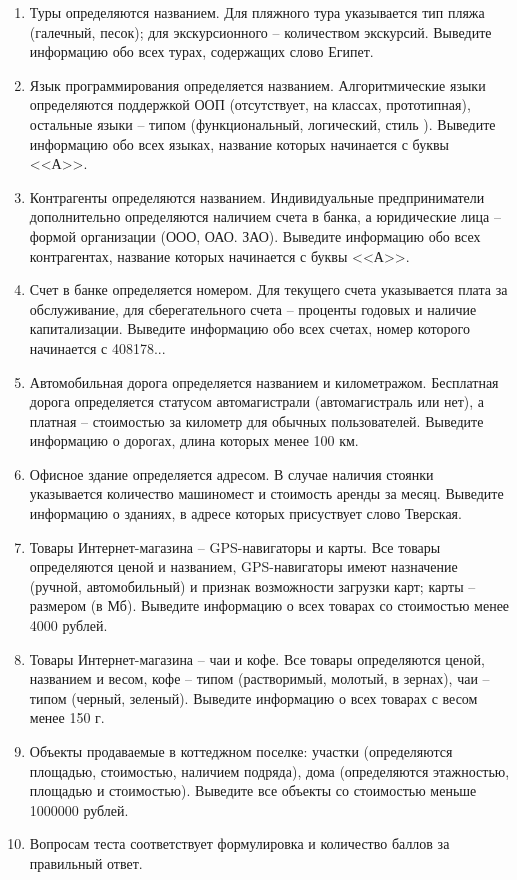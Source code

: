\begin{enumerate}
\item  Туры определяются названием. Для пляжного тура указывается тип пляжа (галечный, песок); для экскурсионного --
количеством экскурсий. Выведите информацию обо всех турах, содержащих слово Египет.
\item Язык программирования определяется названием. Алгоритмические языки определяются поддержкой ООП
(отсутствует, на классах, прототипная), остальные языки -- типом (функциональный, логический, стиль ). 
Выведите информацию обо всех языках, название которых начинается с буквы <<А>>.
\item Контрагенты определяются названием. Индивидуальные предприниматели дополнительно определяются
наличием счета в банка, а юридические лица -- формой организации (ООО, ОАО. ЗАО).
Выведите информацию обо всех контрагентах, название которых начинается с буквы <<А>>.
\item Счет в банке определяется номером. Для текущего счета указывается плата за обслуживание, 
для сберегательного счета -- проценты годовых и наличие капитализации.
Выведите информацию обо всех счетах, номер которого начинается с 408178...
\item Автомобильная дорога определяется названием и километражом. Бесплатная дорога определяется статусом автомагистрали
(автомагистраль или нет), а платная -- стоимостью за километр для обычных пользователей. Выведите информацию о дорогах,
длина которых менее 100 км.
\item Офисное здание определяется адресом. В случае наличия стоянки указывается количество машиномест и стоимость
аренды за месяц. Выведите информацию о зданиях, в адресе которых присуствует слово Тверская.
\item Товары Интернет-магазина -- GPS-навигаторы и карты. 
Все товары определяются ценой и названием, GPS-навигаторы имеют назначение (ручной, автомобильный) и признак 
возможности загрузки карт;
карты -- размером (в Мб).  Выведите информацию о всех товарах со стоимостью менее 4000 рублей.
\item Товары Интернет-магазина --  чаи и кофе.
Все товары определяются ценой, названием и весом, кофе -- типом (растворимый, молотый, в зернах), чаи -- типом
(черный, зеленый). Выведите информацию о всех товарах с весом менее 150 г.
\item Объекты продаваемые в коттеджном поселке: участки (определяются площадью, стоимостью, наличием подряда), дома 
(определяются этажностью, площадью и стоимостью). Выведите все объекты со стоимостью меньше 1000000 рублей.
\item Вопросам теста соответствует формулировка и количество баллов за правильный ответ. 

\end{enumerate}
